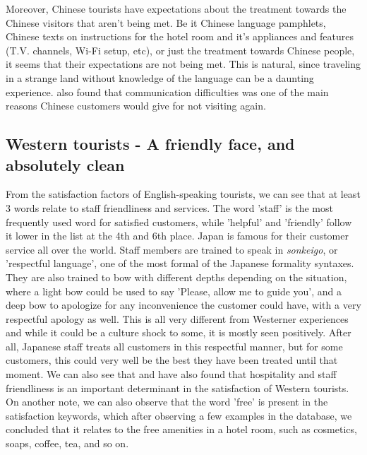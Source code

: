 Moreover, Chinese tourists have expectations about the treatment towards the Chinese visitors that aren't being met. Be it Chinese language pamphlets, Chinese texts on instructions for the hotel room and it's appliances and features (T.V. channels, Wi-Fi setup, etc), or just the treatment towards Chinese people, it seems that their expectations are not being met. This is natural, since traveling in a strange land without knowledge of the language can be a daunting experience. \cite{ryan2001} also found that communication difficulties was one of the main reasons Chinese customers would give for not visiting again. 

\subsection{Western tourists - A friendly face, and absolutely clean}\label{disc:en}

From the satisfaction factors of English-speaking tourists, we can see that at least 3 words relate to staff friendliness and services. The word 'staff' is the most frequently used word for satisfied customers, while 'helpful' and 'friendly' follow it lower in the list at the 4th and 6th place. Japan is famous for their customer service all over the world. Staff members are trained to speak in \textit{sonkeigo}, or 'respectful language', one of the most formal of the Japanese formality syntaxes. They are also trained to bow with different depths depending on the situation, where a light bow could be used to say 'Please, allow me to guide you', and a deep bow to apologize for any inconvenience the customer could have, with a very respectful apology as well. This is all very different from Westerner experiences and while it could be a culture shock to some, it is mostly seen positively. After all, Japanese staff treats all customers in this respectful manner, but for some customers, this could very well be the best they have been treated until that moment. We can also see that \cite{kozak2002} and \cite{shanka2004} have also found that hospitality and staff friendliness is an important determinant in the satisfaction of Western tourists. On another note, we can also observe that the word 'free' is present in the satisfaction keywords, which after observing a few examples in the database, we concluded that it relates to the free amenities in a hotel room, such as cosmetics, soaps, coffee, tea, and so on. 

